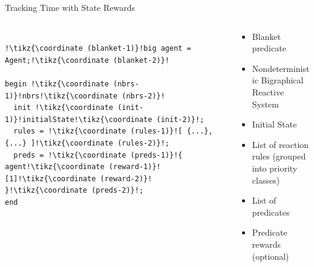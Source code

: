 \documentclass{beamer}
\begin{document}
\begin{frame}[fragile]{Tracking Time with State Rewards}
  \begin{columns}
    \begin{column}{0.5\textwidth}
\begin{lstlisting}[escapechar=!]

!\tikz{\coordinate (blanket-1)}!big agent = Agent;!\tikz{\coordinate (blanket-2)}!

begin !\tikz{\coordinate (nbrs-1)}!nbrs!\tikz{\coordinate (nbrs-2)}!
  init !\tikz{\coordinate (init-1)}!initialState!\tikz{\coordinate (init-2)}!;
  rules = !\tikz{\coordinate (rules-1)}![ {...}, {...} ]!\tikz{\coordinate (rules-2)}!;
  preds = !\tikz{\coordinate (preds-1)}!{ agent!\tikz{\coordinate (reward-1)}![1]!\tikz{\coordinate (reward-2)}! }!\tikz{\coordinate (preds-2)}!;
end

\end{lstlisting}
    \end{column}
    \begin{column}{0.5\textwidth}
      \begin{itemize}
      \item<2-> Blanket predicate
      \item<3-> Nondeterministic Bigraphical Reactive System
      \item<4-> Initial State
      \item<5-> List of reaction rules (grouped into priority classes)
      \item<6-> List of predicates
      \item<7-> Predicate rewards (optional)
      \end{itemize}
    \end{column}
  \end{columns}
\end{frame}
\end{document}
